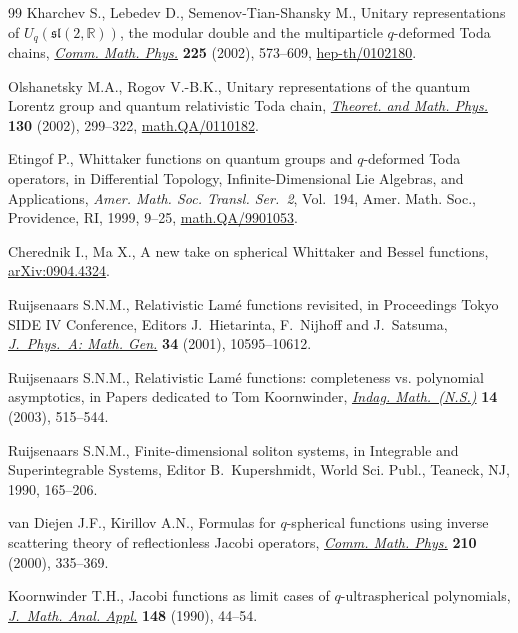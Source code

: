 \documentclass[pdftex]{sigma}
\numberwithin{equation}{section}
\begin{document}
\begin{thebibliography}{99}
Kharchev S., Lebedev D., Semenov-Tian-Shansky M.,
Unitary representations of $U_q(\mathfrak{sl}(2,\mathbb{R}))$, the modular double and the multiparticle $q$-deformed Toda chains,
\href{http://dx.doi.org/10.1007/s002200100592}{{\it Comm. Math. Phys.}} {\bf 225} (2002), 573--609,
\href{http://arxiv.org/abs/hep-th/0102180}{hep-th/0102180}.

Olshanetsky M.A., Rogov V.-B.K.,
Unitary representations of the quantum Lorentz group and quantum relativistic Toda chain,
\href{http://dx.doi.org/10.1023/A:1014713604396}{{\it Theoret. and Math. Phys.}} {\bf 130} (2002), 299--322,
\href{http://arxiv.org/abs/math.QA/0110182}{math.QA/0110182}.

Etingof P.,
Whittaker functions on quantum groups and $q$-deformed Toda operators,
in Dif\/ferential Topology, Inf\/inite-Dimensional Lie Algebras, and Applications, {\it Amer. Math. Soc. Transl. Ser.~2}, Vol.~194, Amer. Math. Soc., Providence, RI, 1999, 9--25,
\href{http://arxiv.org/abs/math.QA/9901053}{math.QA/9901053}.

Cherednik I., Ma X.,
A new take on spherical Whittaker and Bessel functions,
\href{http://arxiv.org/abs/0904.4324}{arXiv:0904.4324}.



Ruijsenaars S.N.M.,
Relativistic Lam\'e functions revisited,
in  Proceedings Tokyo SIDE IV Conference,
Editors J.~Hietarinta, F.~Nijhof\/f and J.~Satsuma,
\href{http://dx.doi.org/10.1088/0305-4470/34/48/323}{{\it J.~Phys.~A: Math. Gen.}} {\bf 34} (2001), 10595--10612.

Ruijsenaars S.N.M.,
Relativistic Lam\'e functions: completeness vs. polynomial asymptotics,
in Papers dedicated to Tom Koornwinder,
\href{http://dx.doi.org/10.1016/S0019-3577(03)90059-0}{{\it Indag. Math.~(N.S.)}} {\bf 14} (2003), 515--544.

Ruijsenaars S.N.M.,
Finite-dimensional soliton systems,
in Integrable and Superintegrable Systems,
Editor B.~Kupershmidt, World Sci. Publ., Teaneck, NJ, 1990,  165--206.

van Diejen J.F., Kirillov A.N.,
Formulas for $q$-spherical functions using inverse scattering theory of ref\/lectionless Jacobi operators,
\href{http://dx.doi.org/10.1007/s002200050783}{{\it Comm. Math. Phys.}} {\bf 210} (2000), 335--369.

Koornwinder T.H.,
Jacobi functions as limit cases of $q$-ultraspherical polynomials,
\href{http://dx.doi.org/10.1016/0022-247X(90)90026-C}{{\it J.~Math. Anal. Appl.}} {\bf 148} (1990), 44--54.


\end{thebibliography}
\end{document}
